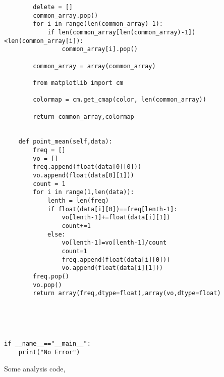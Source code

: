 \begin{verbatim}
        
        

        delete = []
        common_array.pop()
        for i in range(len(common_array)-1):    
            if len(common_array[len(common_array)-1])<len(common_array[i]):
                common_array[i].pop()
        
        common_array = array(common_array)
        
        from matplotlib import cm

        colormap = cm.get_cmap(color, len(common_array))

        return common_array,colormap


    def point_mean(self,data):
        freq = []
        vo = []
        freq.append(float(data[0][0]))
        vo.append(float(data[0][1]))
        count = 1
        for i in range(1,len(data)):
            lenth = len(freq)
            if float(data[i][0])==freq[lenth-1]:
                vo[lenth-1]+=float(data[i][1])
                count+=1
            else:
                vo[lenth-1]=vo[lenth-1]/count
                count=1
                freq.append(float(data[i][0]))
                vo.append(float(data[i][1]))
        freq.pop()
        vo.pop()
        return array(freq,dtype=float),array(vo,dtype=float)



 

if __name__=="__main__":
    print("No Error")
\end{verbatim}



Some analysis code,

